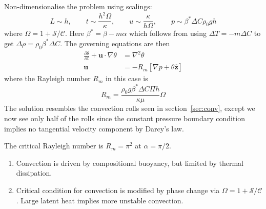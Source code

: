 \documentclass{jknotes}
\renewcommand{\u}{\symbf{u}}
\newcommand{\C}{\mathcal{C}}
\renewcommand{\S}{\mathcal{S}}
\begin{document}
Non-dimensionalise the problem using scalings:
\begin{equation}
	L \sim h, \hspace{2em} t \sim \frac{h^2 \Omega}{\kappa},\hspace{2em} u \sim
	\frac{\kappa}{h\Omega},\hspace{2em} p \sim \beta^* \Delta C \rho_0 g h
\end{equation}
where $\Omega = 1 + \S/\C$. Here $\beta^* = \beta-m\alpha$ which follows from
using $\Delta T = -m\Delta C$ to get $\Delta \rho = \rho_0 \beta^* \Delta C$. The
governing equations are then
\begin{align}
	\frac{\partial \theta}{\partial t} + \u \cdot \nabla \theta &= \nabla^2
	\theta \\
	\u &= -R_m \left[ \nabla p + \theta \hat{\symbf{z}}\right] 
\end{align}
where the Rayleigh number $R_m$ in this case is
\begin{equation}
	R_m = \frac{\rho_0 g \beta^* \Delta C \Pi h}{\kappa \mu} \Omega
\end{equation}
The solution resembles the convection rolls seen in section~\ref{sec:conv},
except we now see only half of the rolls since the constant pressure boundary
condition implies no tangential velocity component by Darcy's law.

\begin{center}
\end{center}

The critical Rayleigh number is $R_m = \pi^2$ at $\alpha = \pi/2$.
\begin{enumerate}
	\item Convection is driven by compositional buoyancy, but limited by
		thermal dissipation.
	\item Critical condition for convection is modified by phase change via
		$\Omega = 1+\S/\C$. Large latent heat implies more unstable
		convection.
\end{enumerate}
\end{document}
